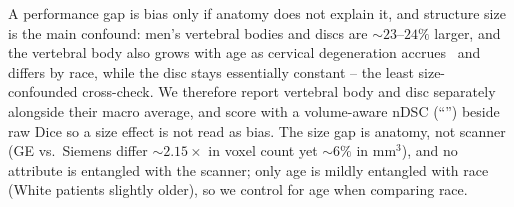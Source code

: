 A performance gap is bias only if anatomy does not explain it, and structure size is the
main confound: men's vertebral bodies and discs are ${\sim}23$--$24\%$ larger, and the
vertebral body also grows with age as cervical degeneration
accrues~\cite{kato2012cervical} and differs by race, while the disc stays essentially
constant -- the least size-confounded cross-check. We therefore report vertebral body and
disc separately alongside their macro average, and score with a volume-aware nDSC
(``'') beside raw Dice so a size effect is not read as bias. The
size gap is anatomy, not scanner (GE vs.\ Siemens differ ${\sim}2.15\times$ in voxel count
yet ${\sim}6\%$ in mm$^3$), and no attribute is entangled with the scanner; only age is
mildly entangled with race (White patients slightly older), so we control for age when
comparing race.
